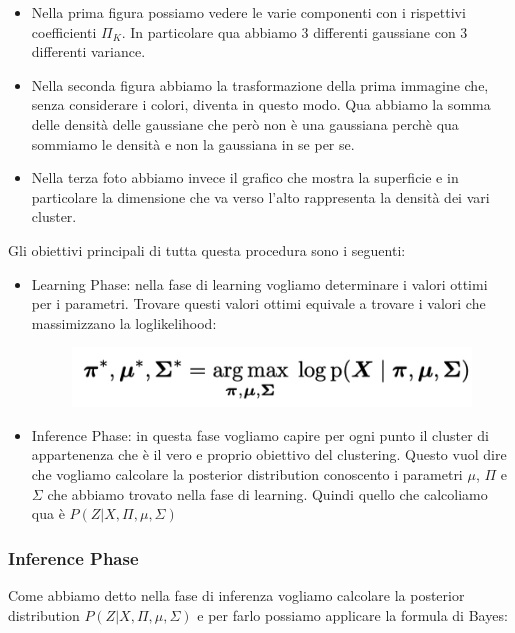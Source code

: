 \documentclass[14pt]{extreport}
\begin{document}
\begin{itemize}
	\item Nella prima figura possiamo vedere le varie componenti con i rispettivi coefficienti $\Pi_K$. In particolare qua abbiamo 3 differenti
	gaussiane con 3 differenti variance.
	\item Nella seconda figura abbiamo la trasformazione della prima immagine che, senza considerare i colori, diventa in questo modo. Qua abbiamo la
	      somma delle densità delle gaussiane che però non è una gaussiana perchè qua sommiamo le densità e non la gaussiana in se per se.
	\item Nella terza foto abbiamo invece il grafico che mostra la superficie e in particolare la dimensione che va verso l'alto rappresenta la
	densità dei vari cluster.
\end{itemize}

Gli obiettivi principali di tutta questa procedura sono i seguenti:
\begin{itemize}
	\item Learning Phase: nella fase di learning vogliamo determinare i valori ottimi per i parametri. Trovare questi valori ottimi equivale a trovare
	i valori che massimizzano la loglikelihood:

	      \begin{figure}[H]
		      \centering
		      \includegraphics[width=0.7\linewidth]{545.jpeg}
	      \end{figure}
	\item Inference Phase: in questa fase vogliamo capire per ogni punto il cluster di appartenenza che è il vero e proprio obiettivo del clustering.
	      Questo vuol dire che vogliamo calcolare la posterior distribution conoscento i parametri $\mu$, $\Pi$ e $\Sigma$ che abbiamo trovato nella
	      fase di learning. Quindi quello che calcoliamo qua è $P(Z|X,\Pi, \mu, \Sigma)$
\end{itemize}

\subsubsection{Inference Phase}

Come abbiamo detto nella fase di inferenza vogliamo calcolare la posterior distribution $P(Z|X,\Pi, \mu, \Sigma)$ e per farlo possiamo applicare la
formula di Bayes:
\end{document}
